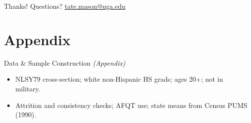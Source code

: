 \documentclass[aspectratio=169,professionalfonts]{beamer}
\begin{document}
\begin{frame}{Thanks!}
  \centering
  Questions? \quad \href{mailto:}{tate.mason@uga.edu}
\end{frame}

\appendix
\section{Appendix}

\begin{frame}{Data \& Sample Construction \textit{(Appendix)}}
  \begin{itemize}
    \item NLSY79 cross-section; white non-Hispanic HS grads; ages 20+; not in military.
    \item Attrition and consistency checks; AFQT use; state means from Census PUMS (1990).
  \end{itemize}
\end{frame}
\end{document}
